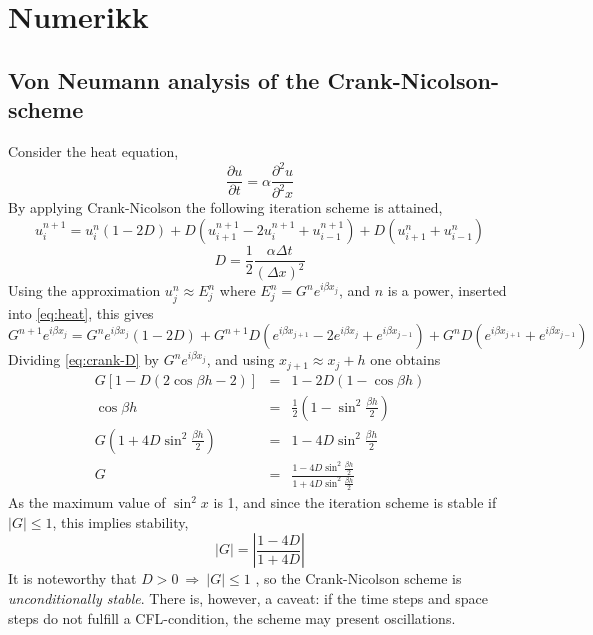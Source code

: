 \chapter{Numerikk}

\section{Von Neumann analysis of the Crank-Nicolson-scheme}

Consider the heat equation,
\begin{equation}
\frac{\partial u}{\partial t} = \alpha\frac{\partial^2u}{\partial^2x}
\label{eq:heat}
\end{equation}
By applying Crank-Nicolson the following iteration scheme is attained,
\begin{equation}
u_i^{n+1} = u_i^n\left(1-2D\right)+D\left(u_{i+1}^{n+1}-2u_i^{n+1}+u_{i-1}^{n+1}\right) + D\left(u_{i+1}^n + u_{i-1}^n\right)
\label{eq:crank}
\end{equation}
\begin{equation}
D = \frac{1}{2}\frac{\alpha\Delta t}{(\Delta x)^2}
\label{eq:crank-D}
\end{equation}
Using the approximation $u_j^n \approx E_j^n$ where $E_j^n = G^ne^{i\beta
x_j}$, and $n$ is a power, inserted into \cref{eq:heat}, this gives
\begin{equation*}
G^{n+1}e^{i\beta x_j} = G^ne^{i\beta x_j}\left(1-2D\right) + G^{n+1}D\left(e^{i\beta x_{j+1}} - 2e^{i\beta x_j} + e^{i\beta x_{j-1}}\right) + G^nD\left(e^{i\beta x_{j+1}} + e^{i\beta x_{j-1}}\right)
\end{equation*}
Dividing \cref{eq:crank-D} by $G^ne^{i\beta x_j}$, and using $x_{j+1} \approx
x_j + h$ one obtains
\begin{eqnarray*}
G\left[1-D\left(2\cos{\beta h} - 2\right)\right] &=& 1 - 2D\left(1-\cos{\beta h}\right) \\
\cos{\beta h} &=& \frac{1}{2}\left(1-\sin^2{\frac{\beta h}{2}}\right) \\
G\left(1+4D\sin^{2}{\frac{\beta h}{2}}\right) &=& 1 - 4D\sin^2{\frac{\beta h}{2}} \\
G &=& \frac{1-4D\sin^2{\frac{\beta h}{2}}}{1+4D\sin^2{\frac{\beta h}{2}}}
\end{eqnarray*}
As the maximum value of $\sin^2{x}$ is 1, and since the iteration scheme is
stable if $|G| \le 1$, this implies stability,
\begin{equation}
|G| = \left|\frac{1-4D}{1+4D}\right|
\end{equation}
It is noteworthy that $D > 0 \ \Rightarrow \ |G| \le 1$ , so the Crank-Nicolson
scheme is \emph{unconditionally stable}. There is, however, a caveat: if the
time steps and space steps do not fulfill a CFL-condition, the scheme may
present oscillations.

